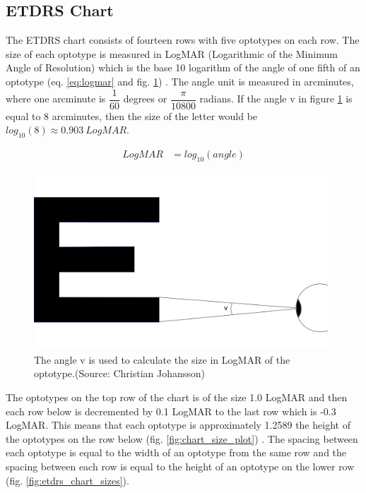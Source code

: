 \documentclass[12pt,a4paper,notitlepage]{report}
\begin{document}
\subsection{ETDRS Chart}
The ETDRS chart consists of fourteen rows with five optotypes on each row. The size of each optotype is measured in LogMAR (Logarithmic of the Minimum Angle of Resolution) which is the base 10 logarithm of the angle of one fifth of an optotype (eq. \ref{eq:logmar} and fig. \ref{fig:logmar_calculation}) \cite{Bailey}. The angle unit is measured in arcminutes, where one arcminute is $\dfrac{1}{60}$ degrees or $\dfrac{\pi}{10800}$ radians. If the angle v in figure \ref{fig:logmar_calculation} is equal to 8 arcminutes, then the size of the letter would be $log_{10}(8) \approx 0.903\ LogMAR$.


\begin{equation}
	\begin{split}
  		LogMAR & = log_{10}(angle)
  	\end{split}
  	\label{eq:logmar}
\end{equation}

\begin{figure}[ht!]
\centering
\includegraphics[width=110mm]{images/logmar_calculation.png}
\caption{The angle v is used to calculate the size in LogMAR of the optotype.(Source: Christian Johansson)\label{fig:logmar_calculation}}
\end{figure} 

The optotypes on the top row of the chart is of the size 1.0 LogMAR and then each row below is decremented by 0.1 LogMAR to the last row which is -0.3 LogMAR. This means that each optotype is approximately 1.2589 the height of the optotypes on the row below (fig. \ref{fig:chart_size_plot}) \cite{Ferris}. The spacing between each optotype is equal to the width of an optotype from the same row and the spacing between each row is equal to the height of an optotype on the lower row (fig. \ref{fig:etdrs_chart_sizes}).
\end{document}
